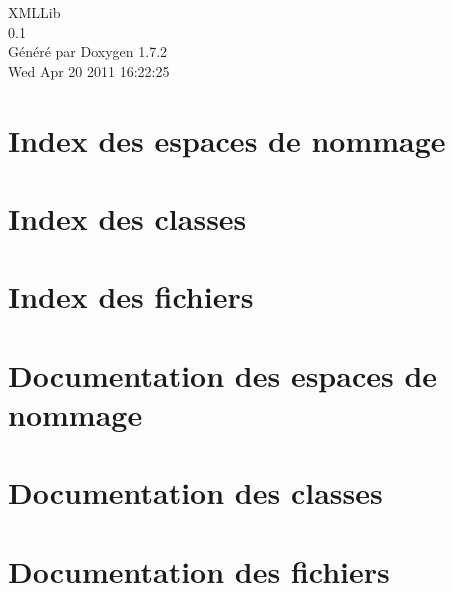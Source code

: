 \documentclass[a4paper]{book}
\begin{document}
\hypersetup{pageanchor=false}
\begin{titlepage}
\vspace*{7cm}
\begin{center}
{\Large XMLLib \\[1ex]\large 0.1 }\\
\vspace*{1cm}
{\large Généré par Doxygen 1.7.2}\\
\vspace*{0.5cm}
{\small Wed Apr 20 2011 16:22:25}\\
\end{center}
\end{titlepage}
\clearemptydoublepage
{}
\tableofcontents
\clearemptydoublepage
{}
\hypersetup{pageanchor=true}
\chapter{Index des espaces de nommage}

\chapter{Index des classes}

\chapter{Index des fichiers}

\chapter{Documentation des espaces de nommage}

\chapter{Documentation des classes}





\chapter{Documentation des fichiers}










\printindex
\end{document}
